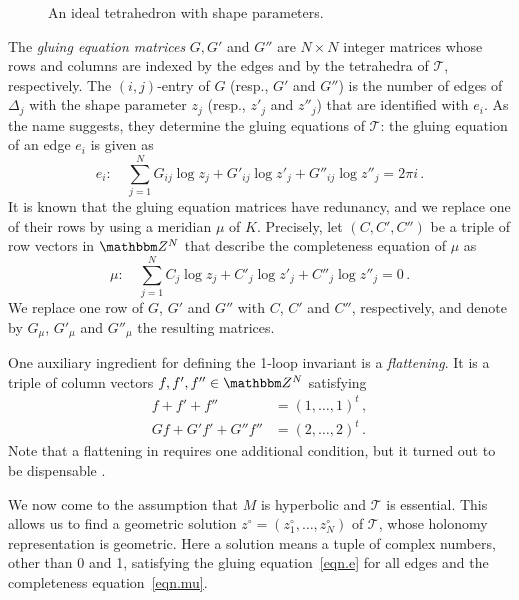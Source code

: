 \documentclass[12pt,reqno]{amsart}
\theoremstyle{definition}
\def\BZ{\mathbbm Z}
\def\calT{\mathcal T}
\def\be{\begin{equation}}
\def\ee{\end{equation}}
\begin{document}
\begin{figure}[htpb!]

\caption{An ideal tetrahedron with shape parameters.}
\label{fig.tetrahedron}
\end{figure}

The \emph{gluing equation matrices} $G, G'$ and $G''$  are $N \times N$ integer
matrices whose rows and columns are indexed by the edges and by the tetrahedra
of $\calT$,  respectively. The $(i,j)$-entry of $G$ (resp., $G'$ and $G''$) is 
the number of edges of $\Delta_j$ with the shape parameter $z_j$ (resp., $z'_j$
and $z''_j$) that are identified with $e_i$. As the name suggests, they 
determine the gluing equations of $\calT$: the gluing equation of an edge $e_i$
is given as 
\be
\label{eqn.e}
e_i :  \quad \sum_{j=1}^N  G_{ij} \log z_j + G'_{ij} \log z'_j
+ G''_{ij} \log z''_j = 2 \pi i \, .
\ee 
It is known that the gluing equation matrices have redunancy, and we replace
one of their rows by using a meridian $\mu$ of $K$. Precisely, let $(C,C',C'')$ 
be a triple of row vectors in $\BZ^N$ that describe the completeness equation
of $\mu$ as
\be
\label{eqn.mu}
\mu : \quad \sum_{j=1}^N C_{j}\log z_j +C'_{j} \log z'_j
+ C''_{j} \log z''_j  = 0 \, .
\ee
We replace one row of $G$, $G'$ and $G''$ with $C$, $C'$ and $C''$, respectively,
and denote by $G_\mu$, $G'_\mu$ and $G''_\mu$ the resulting matrices.

One auxiliary ingredient for defining the 1-loop invariant is a 
\emph{flattening}. It is a triple of column vectors $f, f', f'' \in \BZ^N$
satisfying
\begin{align*}
f+ f' +  f'' & =(1,\ldots,1)^t \,, \\
G f + G' f' +G'' f'' & =(2,\ldots,2)^t \, .
\end{align*}
Note that a flattening in \cite{DG1} requires one additional condition,
but it turned out to be dispensable \cite{Yoon2024}.

We now come to the assumption that $M$ is hyperbolic and $\calT$ is essential. 
This allows us to find a 
geometric solution $z^\circ=(z^\circ_1,\ldots, z^\circ_N )$
of $\calT$, whose holonomy representation is geometric. Here a solution
means  a tuple of complex numbers, other than 0 and 1, satisfying 
the gluing equation~\eqref{eqn.e} for all edges and the completeness
equation~\eqref{eqn.mu}. 
\end{document}
